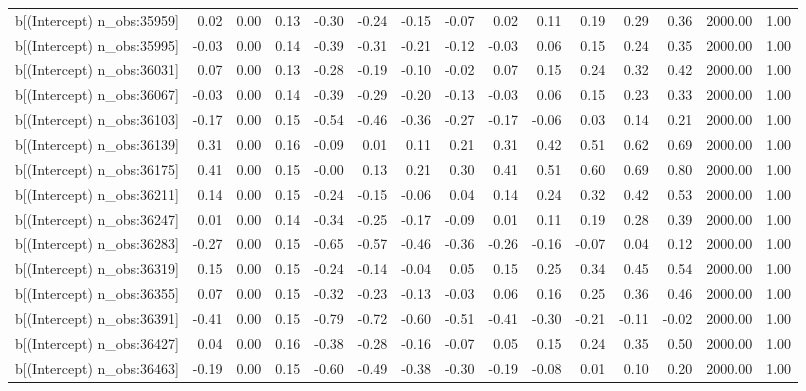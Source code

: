 \begin{table}[ht]
\begin{tabular}{rrrrrrrrrrrrrrr}
  b[(Intercept) n\_obs:35959] & 0.02 & 0.00 & 0.13 & -0.30 & -0.24 & -0.15 & -0.07 & 0.02 & 0.11 & 0.19 & 0.29 & 0.36 & 2000.00 & 1.00 \\ 
  b[(Intercept) n\_obs:35995] & -0.03 & 0.00 & 0.14 & -0.39 & -0.31 & -0.21 & -0.12 & -0.03 & 0.06 & 0.15 & 0.24 & 0.35 & 2000.00 & 1.00 \\ 
  b[(Intercept) n\_obs:36031] & 0.07 & 0.00 & 0.13 & -0.28 & -0.19 & -0.10 & -0.02 & 0.07 & 0.15 & 0.24 & 0.32 & 0.42 & 2000.00 & 1.00 \\ 
  b[(Intercept) n\_obs:36067] & -0.03 & 0.00 & 0.14 & -0.39 & -0.29 & -0.20 & -0.13 & -0.03 & 0.06 & 0.15 & 0.23 & 0.33 & 2000.00 & 1.00 \\ 
  b[(Intercept) n\_obs:36103] & -0.17 & 0.00 & 0.15 & -0.54 & -0.46 & -0.36 & -0.27 & -0.17 & -0.06 & 0.03 & 0.14 & 0.21 & 2000.00 & 1.00 \\ 
  b[(Intercept) n\_obs:36139] & 0.31 & 0.00 & 0.16 & -0.09 & 0.01 & 0.11 & 0.21 & 0.31 & 0.42 & 0.51 & 0.62 & 0.69 & 2000.00 & 1.00 \\ 
  b[(Intercept) n\_obs:36175] & 0.41 & 0.00 & 0.15 & -0.00 & 0.13 & 0.21 & 0.30 & 0.41 & 0.51 & 0.60 & 0.69 & 0.80 & 2000.00 & 1.00 \\ 
  b[(Intercept) n\_obs:36211] & 0.14 & 0.00 & 0.15 & -0.24 & -0.15 & -0.06 & 0.04 & 0.14 & 0.24 & 0.32 & 0.42 & 0.53 & 2000.00 & 1.00 \\ 
  b[(Intercept) n\_obs:36247] & 0.01 & 0.00 & 0.14 & -0.34 & -0.25 & -0.17 & -0.09 & 0.01 & 0.11 & 0.19 & 0.28 & 0.39 & 2000.00 & 1.00 \\ 
  b[(Intercept) n\_obs:36283] & -0.27 & 0.00 & 0.15 & -0.65 & -0.57 & -0.46 & -0.36 & -0.26 & -0.16 & -0.07 & 0.04 & 0.12 & 2000.00 & 1.00 \\ 
  b[(Intercept) n\_obs:36319] & 0.15 & 0.00 & 0.15 & -0.24 & -0.14 & -0.04 & 0.05 & 0.15 & 0.25 & 0.34 & 0.45 & 0.54 & 2000.00 & 1.00 \\ 
  b[(Intercept) n\_obs:36355] & 0.07 & 0.00 & 0.15 & -0.32 & -0.23 & -0.13 & -0.03 & 0.06 & 0.16 & 0.25 & 0.36 & 0.46 & 2000.00 & 1.00 \\ 
  b[(Intercept) n\_obs:36391] & -0.41 & 0.00 & 0.15 & -0.79 & -0.72 & -0.60 & -0.51 & -0.41 & -0.30 & -0.21 & -0.11 & -0.02 & 2000.00 & 1.00 \\ 
  b[(Intercept) n\_obs:36427] & 0.04 & 0.00 & 0.16 & -0.38 & -0.28 & -0.16 & -0.07 & 0.05 & 0.15 & 0.24 & 0.35 & 0.50 & 2000.00 & 1.00 \\ 
  b[(Intercept) n\_obs:36463] & -0.19 & 0.00 & 0.15 & -0.60 & -0.49 & -0.38 & -0.30 & -0.19 & -0.08 & 0.01 & 0.10 & 0.20 & 2000.00 & 1.00 \\ 

\end{tabular}
\end{table}

